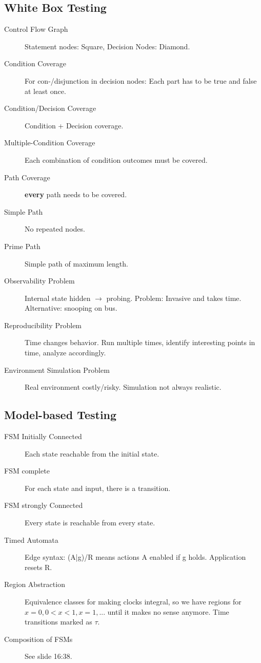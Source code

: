 \subsection{White Box Testing}
\begin{description}
	\item[Control Flow Graph] Statement nodes: Square, Decision Nodes: Diamond.
	\item[Condition Coverage] For con-/disjunction in decision nodes: Each
	part has to be true and false at least once.
	\item[Condition/Decision Coverage] Condition + Decision coverage.
	\item[Multiple-Condition Coverage] Each combination of condition outcomes must
	be covered.
	\item[Path Coverage] \textbf{every} path needs to be covered.
	\item[Simple Path] No repeated nodes.
	\item[Prime Path] Simple path of maximum length.
	\item[Observability Problem] Internal state hidden $\rightarrow$ probing.
	Problem: Invasive and takes time. Alternative: snooping on bus.
	\item[Reproducibility Problem] Time changes behavior. Run multiple times,
	identify interesting points in time, analyze accordingly.
	\item[Environment Simulation Problem] Real environment costly/risky. Simulation
	not always realistic.
\end{description}

\subsection{Model-based Testing}
\begin{description}
	\item[FSM Initially Connected] Each state reachable from the initial state.
	\item[FSM complete] For each state and input, there is a transition.
	\item[FSM strongly Connected] Every state is reachable from every state.
	\item[Timed Automata] Edge syntax: (A|g)/R means actions A enabled if g holds.
	Application resets R.
	\item[Region Abstraction] Equivalence classes for making clocks integral, so we
	have regions for $x = 0, 0 < x < 1, x = 1, ...$ until it makes no sense
	anymore. Time transitions marked as $\tau$.
	\item[Composition of FSMs] See slide 16:38.
\end{description}

